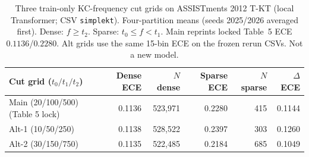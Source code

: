 \begin{table}[htbp]
\caption{Three train-only KC-frequency cut grids on ASSISTments 2012 T-KT (local Transformer; CSV \texttt{simplekt}). Four-partition means (seeds 2025/2026 averaged first). Dense: $f\ge t_2$. Sparse: $t_0\le f<t_1$. Main reprints locked Table~5 ECE $0.1136$/$0.2280$. Alt grids use the same 15-bin ECE on the frozen rerun CSVs. Not a new model.}
\label{tab:s7_threecut}
\centering
\small
\begin{tabular}{lrrrrr}
\toprule
Cut grid ($t_0/t_1/t_2$) & Dense ECE & $N$ dense & Sparse ECE & $N$ sparse & $\Delta$ECE \\
\midrule
Main (20/100/500) (Table 5 lock) & 0.1136 & 523,971 & 0.2280 & 415 & 0.1144 \\
Alt-1 (10/50/250) & 0.1138 & 528,522 & 0.2397 & 303 & 0.1260 \\
Alt-2 (30/150/750) & 0.1135 & 522,485 & 0.2184 & 685 & 0.1049 \\
\bottomrule
\end{tabular}
\end{table}
